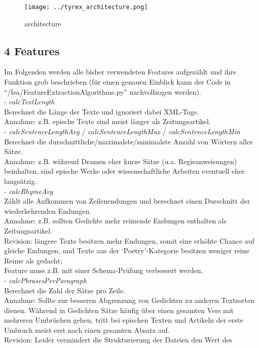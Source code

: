 \documentclass[]{article}
\begin{document}
\begin{figure}[htbp]
\centering
\texttt{[image: ../tyrex\_architecture.png]}
\caption{architecture}
\end{figure}

\subsection{4 Features}\label{features}

Im Folgenden werden alle bisher verwendeten Features aufgezählt und ihre
Funktion grob beschrieben (für einen genauen Einblick kann der Code in
``/fea/FeatureExtractionAlgorithms.py'' nachvollzogen werden).\\
- \emph{calcTextLength}\\
Berechnet die Länge der Texte und ignoriert dabei XML-Tags.\\
Annahme: z.B. epische Texte sind meist länger als Zeitungsartikel.\\
- \emph{calcSentenceLengthAvg} / \emph{calcSentenceLengthMax} /
\emph{calcSentenceLengthMin}\\
Berechnet die durschnittliche/maximalste/minimalste Anzahl von Wörtern
aller Sätze.\\
Annahme: z.B. während Dramen eher kurze Sätze (u.a. Regieanweisungen)
beinhalten, sind epische Werke oder wissenschaftliche Arbeiten eventuell
eher langsätzig.\\
- \emph{calcRhymeAvg}\\
Zählt alle Aufkommen von Zeilenendungen und berechnet einen Durschnitt
der wiederkehrenden Endungen.\\
Annahme: z.B. sollten Gedichte mehr reimende Endungen enthalten als
Zeitungsartikel.\\
Revision: längere Texte besitzen mehr Endungen, somit eine erhöhte
Chance auf gleiche Endungen, und Texte aus der `Poetry'-Kategorie
besitzen weniger reine Reime als gedacht;\\
Feature muss z.B. mit einer Schema-Prüfung verbessert werden.\\
- \emph{calcPhrasesPerParagraph}\\
Berechnet die Zahl der Sätze pro Zeile.\\
Annahme: Sollte zur besseren Abgrenzung von Gedichten zu anderen
Textsorten dienen. Während in Gedichten Sätze häufig über einen gesamten
Vers mit mehreren Umbrüchen gehen, tritt bei epischen Texten und
Artikeln der erste Umbruch meist erst nach einen gesamten Absatz auf.\\
Revision: Leider vermindert die Strukturierung der Dateien den Wert des
\end{document}
